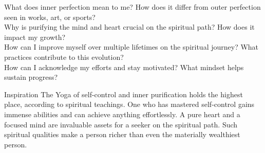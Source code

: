 \newpage
\begin{mananam}{}
\mananamtext What does inner perfection mean to me? How does it differ from outer perfection seen in works, art, or sports?\\
Why is purifying the mind and heart crucial on the spiritual path? How does it impact my growth?\\
How can I improve myself over multiple lifetimes on the spiritual journey? What practices contribute to this evolution?\\
How can I acknowledge my efforts and stay motivated? What mindset helps sustain progress?
\end{mananam}
\WritingHand{}
\begin{inspiration}{\mananamfont Inspiration}
\mananamtext The Yoga of self-control and inner purification holds the highest place, according to spiritual teachings. One who has mastered self-control gains immense abilities and can achieve anything effortlessly. A pure heart and a focused mind are invaluable assets for a seeker on the spiritual path. Such spiritual qualities make a person richer than even the materially wealthiest person. 
\end{inspiration}
\newpage